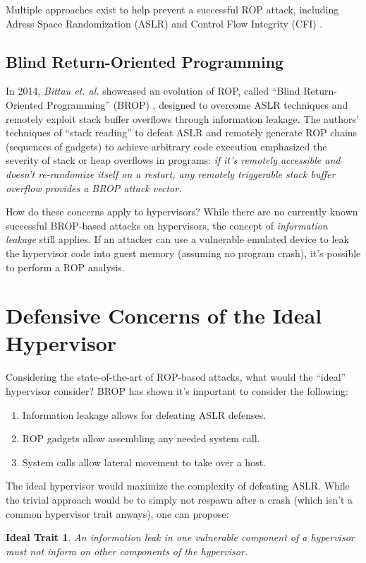 \documentclass[conference]{IEEEtran}
\newtheorem{trait}{Ideal Trait}
\begin{document}
Multiple approaches exist to help prevent a successful ROP attack,
including Adress Space Randomization (ASLR) and Control Flow Integrity
(CFI) \cite{b4}.

\subsection{Blind Return-Oriented Programming}
In 2014, \emph{Bittau et. al.} showcased an evolution of ROP, called
``Blind Return-Oriented Programming'' (BROP) \cite{b5}, designed to
overcome ASLR techniques and remotely exploit stack buffer overflows
through information leakage. The authors' techniques of ``stack
reading'' to defeat ASLR and remotely generate ROP chains (sequences
of gadgets) to achieve arbitrary code execution emphasized the
severity of stack or heap overflows in programs: \emph{if it's
remotely accessible and doesn't re-randomize itself on a restart, any
remotely triggerable stack buffer overflow provides a BROP attack
vector.}

How do these concerns apply to hypervisors? While there are no
currently known successful BROP-based attacks on hypervisors, the
concept of \emph{information leakage} still applies. If an attacker
can use a vulnerable emulated device to leak the hypervisor code into
guest memory (assuming no program crash), it's possible to perform a
ROP analysis.


\section{Defensive Concerns of the Ideal Hypervisor}
Considering the state-of-the-art of ROP-based attacks, what would the
``ideal'' hypervisor consider? BROP has shown it's important to
consider the following:

\begin{enumerate}
\item Information leakage allows for defeating ASLR defenses.
\item ROP gadgets allow assembling any needed system call.
\item System calls allow lateral movement to take over a host.
\end{enumerate}

The ideal hypervisor would maximize the complexity of defeating
ASLR. While the trivial approach would be to simply not respawn after
a crash (which isn't a common hypervisor trait anways), one can
propose:

\begin{trait}
An information leak in one vulnerable component of a hypervisor must
not inform on other components of the hypervisor.
\end{trait}
\end{document}
